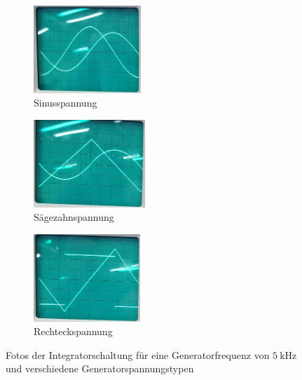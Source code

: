 \begin{figure}
    \centering
    \begin{subfigure}{0.3\textwidth}
        \centering
        \includegraphics[height=3.3cm]{images/foto_03_ausschnitt.jpg}
        \caption{Sinusspannung}
        \label{fig:foto_sin_integrator}
    \end{subfigure}
    \begin{subfigure}{0.3\textwidth}
        \centering
        \includegraphics[height=3.3cm]{images/foto_04_ausschnitt.jpg}
        \caption{Sägezahnspannung}
        \label{fig:foto_saege_integrator}
    \end{subfigure}
    \begin{subfigure}{0.3\textwidth}
        \centering
        \includegraphics[height=3.3cm]{images/foto_05_ausschnitt.jpg}
        \caption{Rechteckspannung}
        \label{fig:foto_rechteck_integrator}
    \end{subfigure}
    \caption{Fotos der Integratorschaltung für eine Generatorfrequenz von $\SI{5}{\kilo\hertz}$ und verschiedene Generatorspannungstypen}
    \label{fig:fotos_integrator}
\end{figure}